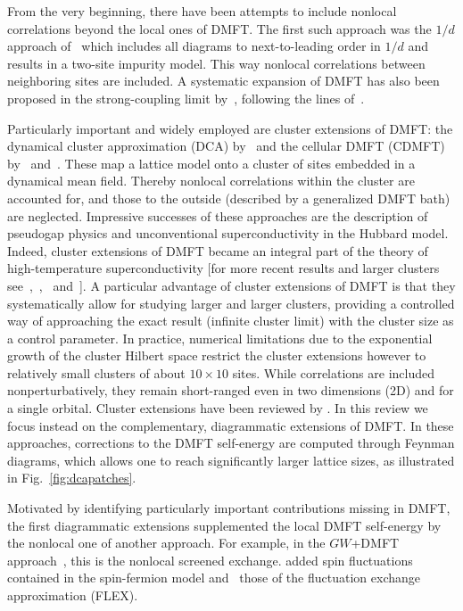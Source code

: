 \documentclass[rmp,aps,reprint,amsmath,amssymb,superscriptaddress,showpacs,nofootinbib]{revtex4-1}
\begin{document}
From the very beginning, there have been attempts to include nonlocal correlations beyond the local ones of DMFT. The first such approach was
the $1/d$  approach of~ which includes all diagrams  to next-to-leading order in $1/d$ and results
in a two-site impurity model. This way nonlocal correlations between neighboring sites are included. A systematic expansion of DMFT has also been proposed in the strong-coupling limit by~, following the lines of~.

Particularly important and widely employed are cluster extensions of DMFT: the dynamical cluster approximation (DCA) by~ and the cellular DMFT (CDMFT) by~ and~. These map a lattice model onto a cluster of sites embedded in a dynamical mean field. Thereby  nonlocal correlations within the cluster are accounted for, and those to the outside (described by a generalized DMFT bath) are neglected. Impressive successes of these approaches are  the description of pseudogap physics and unconventional superconductivity in the Hubbard model. Indeed, cluster extensions of DMFT became an integral part of  the theory of high-temperature superconductivity [for more recent results and larger clusters see~,~,~ and~]. A particular advantage of cluster extensions of DMFT is that they systematically allow for studying larger and larger clusters, providing a controlled way of approaching the exact result (infinite cluster limit) with the cluster size as a control parameter. In practice, numerical limitations due to the exponential growth of the cluster Hilbert space restrict the cluster extensions however to relatively small clusters of about $10\times 10$ sites. While correlations are included nonperturbatively, they remain  short-ranged even in two dimensions (2D) and for a single orbital. Cluster extensions have been reviewed by . In this review we focus instead on the complementary, diagrammatic extensions of DMFT. In these approaches, corrections to the DMFT self-energy are computed through Feynman diagrams, which  allows one to reach significantly larger lattice sizes, as illustrated in  Fig.~\ref{fig:dcapatches}.

Motivated by identifying particularly important contributions missing in DMFT, the first diagrammatic extensions supplemented the local DMFT self-energy by the nonlocal one of another approach. For example, in the $GW$+DMFT approach~\cite{Sun02,Biermann2003}, this is the nonlocal  screened exchange.  added spin fluctuations contained in the spin-fermion model and~ those of the fluctuation exchange approximation (FLEX).
\end{document}
